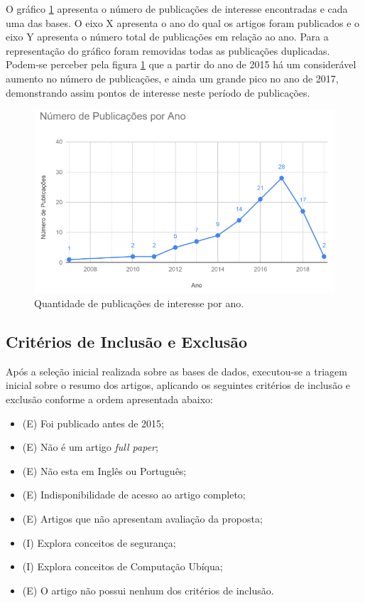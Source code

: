 \documentclass[tid,table]{texufpel} %
\begin{document}
O gráfico \ref{fig:grafPublicaAno} apresenta o número de publicações de interesse encontradas e cada uma das bases. O eixo X apresenta o ano do qual os artigos foram publicados e o eixo Y apresenta o número total de publicações em relação ao ano. Para a representação do gráfico foram removidas todas as publicações duplicadas. Podem-se perceber pela figura \ref{fig:grafPublicaAno} que a partir do ano de 2015 há um considerável aumento no número de publicações, e ainda um grande pico no ano de 2017, demonstrando assim pontos de interesse neste período de publicações.

\begin{figure}[ht]
	\centering
	\includegraphics[width=.9\textwidth]{imagens/grafPublicaAno.png}
	\caption{Quantidade de publicações de interesse por ano.}
	\label{fig:grafPublicaAno}
\end{figure}

\subsection{Critérios de Inclusão e Exclusão}
Após a seleção inicial realizada sobre as bases de dados, executou-se a triagem inicial sobre o resumo dos artigos, aplicando os seguintes critérios de inclusão e exclusão conforme a ordem apresentada abaixo: 
\begin{itemize}
	\item (E) Foi publicado antes de 2015;
	\item (E) Não é um artigo \textit{full paper};
	\item (E) Não esta em Inglês ou Português;
	\item (E) Indisponibilidade de acesso ao artigo completo;
	\item (E) Artigos que não apresentam avaliação da proposta;
	\item (I) Explora conceitos de segurança;
	\item (I) Explora conceitos de Computação Ubíqua;
	\item (E) O artigo não possui nenhum dos critérios de inclusão.
\end{itemize}
	
\end{document}
